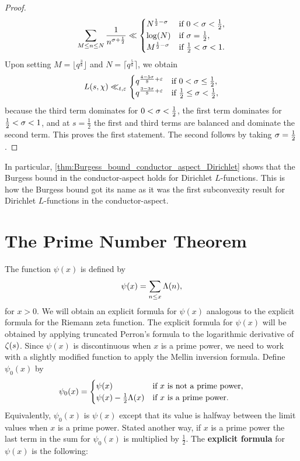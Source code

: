 \begin{proof}
      \[
        \sum_{M \le n \le N}\frac{1}{n^{\sigma+\frac{1}{2}}} \ll \begin{cases} N^{\frac{1}{2}-\sigma} & \text{if $0 < \sigma < \frac{1}{2}$}, \\ \log(N) & \text{if $\sigma = \frac{1}{2}$}, \\ M^{\frac{1}{2}-\sigma} & \text{if $\frac{1}{2} < \sigma < 1$}. \end{cases}
      \]
       Upon setting $M = \lfloor q^{\frac{3}{8}} \rfloor$ and $N = \lceil q^{\frac{5}{8}} \rceil$, we obtain
      \[
        L(s,\chi) \ll_{t,\varepsilon} \begin{cases} q^{\frac{4-5\sigma}{8}+\varepsilon} & \text{if $0 < \sigma \le \frac{1}{2}$}, \\ q^{\frac{3-3\sigma}{8}+\varepsilon} & \text{if $\frac{1}{2} \le \sigma < \frac{1}{2}$}, \end{cases}
      \]
      because the third term dominates for $0 < \sigma < \frac{1}{2}$, the first term dominates for $\frac{1}{2} < \sigma < 1$, and at $s = \frac{1}{2}$ the first and third terms are balanced and dominate the second term. This proves the first statement. The second follows by taking $\sigma = \frac{1}{2}$.
    \end{proof}

    In particular, \cref{thm:Burgess_bound_conductor_aspect_Dirichlet} shows that the Burgess bound in the conductor-aspect holds for Dirichlet $L$-functions. This is how the Burgess bound got its name as it was the first subconvexity result for Dirichlet $L$-functions in the conductor-aspect.
  \section{The Prime Number Theorem}
    The function $\psi(x)$ is defined by
    \[
      \psi(x) = \sum_{n \le x}\Lambda(n),
    \]
    for $x > 0$. We will obtain an explicit formula for $\psi(x)$ analogous to the explicit formula for the Riemann zeta function. The explicit formula for $\psi(x)$ will be obtained by applying truncated Perron's formula to the logarithmic derivative of $\zeta(s)$. Since $\psi(x)$ is discontinuous when $x$ is a prime power, we need to work with a slightly modified function to apply the Mellin inversion formula. Define $\psi_{0}(x)$ by
    \[
      \psi_{0}(x) = \begin{cases} \psi(x) & \text{if $x$ is not a prime power}, \\ \psi(x)-\frac{1}{2}\Lambda(x) & \text{if $x$ is a prime power}. \end{cases}
    \]
    Equivalently, $\psi_{0}(x)$ is $\psi(x)$ except that its value is halfway between the limit values when $x$ is a prime power. Stated another way, if $x$ is a prime power the last term in the sum for $\psi_{0}(x)$ is multiplied by $\frac{1}{2}$. The \textbf{explicit formula} for $\psi(x)$ is the following:


